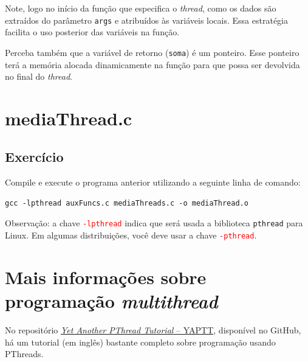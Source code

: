Note, logo no início da função que especifica o \textit{thread}, como os dados são extraídos do parâmetro \texttt{args} e atribuídos às variáveis locais. Essa estratégia facilita o uso posterior das variáveis na função.

Perceba também que a variável de retorno (\texttt{soma}) é um ponteiro. Esse ponteiro terá a memória alocada dinamicamente na função para que possa ser devolvida no final do \textit{thread}. 

\section*{mediaThread.c}


\subsection{Exercício}
Compile e execute o programa anterior utilizando a seguinte linha de comando:

\begin{lstlisting}[style=MyBashStyle]
gcc -lpthread auxFuncs.c mediaThreads.c -o mediaThread.o
\end{lstlisting}

\textcolor{orange}{\faExclamationTriangle} Observação: a chave \textcolor{red}{\texttt{-lpthread}} indica que será usada a biblioteca \texttt{pthread} para Linux. Em algumas distribuições, você deve usar a chave \textcolor{red}{\texttt{-pthread}}.


\section{Mais informações sobre programação \textit{multithread}}

No repositório \href{https://github.com/gradvohl/YAPTT}{\textit{Yet Another PThread Tutorial} -- YAPTT}, disponível no GitHub, há um tutorial (em inglês) bastante completo sobre programação usando PThreads.
